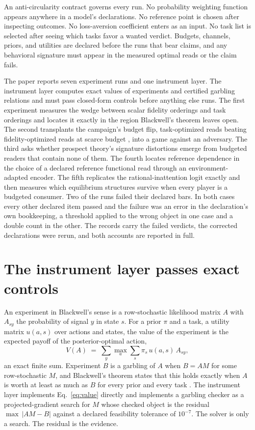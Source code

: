 \documentclass[aps,pre,reprint,nofootinbib]{revtex4-2}
\begin{document}
An anti-circularity contract governs every run.  No probability
weighting function appears anywhere in a model's declarations.  No
reference point is chosen after inspecting outcomes.  No
loss-aversion coefficient enters as an input.  No task list is
selected after seeing which tasks favor a wanted verdict.  Budgets,
channels, priors, and utilities are declared before the runs that
bear claims, and any behavioral signature must appear in the measured
optimal reads or the claim fails.

The paper reports seven experiment runs and one instrument layer.
The instrument layer computes exact values of experiments and
certified garbling relations and must pass closed-form controls
before anything else runs.  The first experiment measures the wedge
between scalar fidelity orderings and task orderings and locates it
exactly in the region Blackwell's theorem leaves open.  The second
transplants the campaign's budget flip, task-optimized reads beating
fidelity-optimized reads at scarce budget \cite{QuantumPaper}, into a
game against an adversary.  The third asks whether prospect theory's
signature distortions emerge from budgeted readers that contain none
of them.  The fourth locates reference dependence in the choice of a
declared reference functional read through an environment-adapted
encoder.  The fifth replicates the rational-inattention logit exactly
and then measures which equilibrium structures survive when every
player is a budgeted consumer.  Two of the runs failed their declared
bars.  In both cases every other declared item passed and the
failure was an error in the declaration's own bookkeeping, a
threshold applied to the wrong object in one case and a double count
in the other.  The records carry the failed verdicts, the corrected
declarations were rerun, and both accounts are reported in full.

\section{The instrument layer passes exact controls}
\label{sec:gd0}

An experiment in Blackwell's sense is a row-stochastic likelihood
matrix $A$ with $A_{sy}$ the probability of signal $y$ in state $s$.
For a prior $\pi$ and a task, a utility matrix $u(a,s)$ over actions
and states, the value of the experiment is the expected payoff of the
posterior-optimal action,
\begin{equation}
  V(A) \;=\; \sum_y \max_a \sum_s \pi_s\, u(a,s)\, A_{sy},
  \label{eq:value}
\end{equation}
an exact finite sum.  Experiment $B$ is a garbling of $A$ when
$B = AM$ for some row-stochastic $M$, and Blackwell's theorem states
that this holds exactly when $A$ is worth at least as much as $B$ for
every prior and every task \cite{Blackwell1953}.  The instrument
layer implements Eq.~\eqref{eq:value} directly and implements a
garbling checker as a projected-gradient search for $M$ whose checked
object is the residual $\max\,\lvert AM - B\rvert$ against a declared
feasibility tolerance of $10^{-7}$.  The solver is only a search.
The residual is the evidence.
\end{document}
